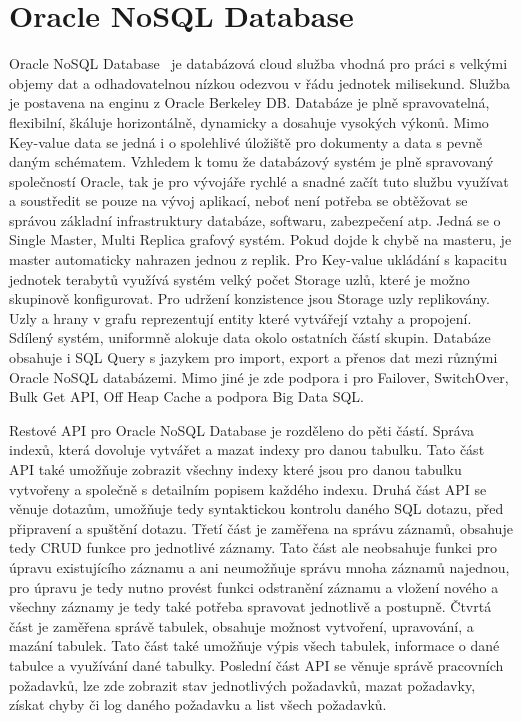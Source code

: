 \documentclass[czech,master,dept460,male,csharp,cpdeclaration]{diploma}
\begin{document}
	\section{Oracle NoSQL Database}
	
	Oracle NoSQL Database~\cite{oraclenosqldb} je databázová cloud služba vhodná pro práci s velkými objemy dat a odhadovatelnou nízkou odezvou v řádu jednotek milisekund. Služba je postavena na enginu z Oracle Berkeley DB. Databáze je plně spravovatelná, flexibilní, škáluje horizontálně, dynamicky a dosahuje vysokých výkonů. Mimo Key-value data se jedná i o spolehlivé úložiště pro dokumenty a data s pevně daným schématem. Vzhledem k tomu že databázový systém je plně spravovaný společností Oracle, tak je pro vývojáře rychlé a snadné začít tuto službu využívat a soustředit se pouze na vývoj aplikací, neboť není potřeba se obtěžovat se správou základní infrastruktury databáze, softwaru, zabezpečení atp. Jedná se o Single Master, Multi Replica grafový systém. Pokud dojde k chybě na masteru, je master automaticky nahrazen jednou z replik. Pro Key-value ukládání s kapacitu jednotek terabytů využívá systém velký počet Storage uzlů, které je možno skupinově konfigurovat. Pro udržení konzistence jsou Storage uzly replikovány. Uzly a hrany v grafu reprezentují entity které vytvářejí vztahy a propojení. Sdílený systém, uniformně alokuje data okolo ostatních částí skupin. Databáze obsahuje i SQL Query s jazykem pro import, export a přenos dat mezi různými Oracle NoSQL databázemi. Mimo jiné je zde podpora i pro Failover, SwitchOver, Bulk Get API, Off Heap Cache a podpora Big Data SQL.
	
	Restové API pro Oracle NoSQL Database je rozděleno do pěti částí. Správa indexů, která dovoluje vytvářet a mazat indexy pro danou tabulku. Tato část API také umožňuje zobrazit všechny indexy které jsou pro danou tabulku vytvořeny a společně s detailním popisem každého indexu. Druhá část API se věnuje dotazům, umožňuje tedy syntaktickou kontrolu daného SQL dotazu, před připravení a spuštění dotazu. Třetí část je zaměřena na správu záznamů, obsahuje tedy CRUD funkce pro jednotlivé záznamy. Tato část ale neobsahuje funkci pro úpravu existujícího záznamu a ani neumožňuje správu mnoha záznamů najednou, pro úpravu je tedy nutno provést funkci odstranění záznamu a vložení nového a všechny záznamy je tedy také potřeba spravovat jednotlivě a postupně. Čtvrtá část je zaměřena správě tabulek, obsahuje možnost vytvoření, upravování, a mazání tabulek. Tato část také umožňuje výpis všech tabulek, informace o dané tabulce a využívání dané tabulky. Poslední část API se věnuje správě pracovních požadavků, lze zde zobrazit stav jednotlivých požadavků, mazat požadavky, získat chyby či log daného požadavku a list všech požadavků.
		
\end{document}
